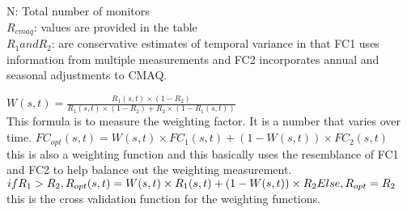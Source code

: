 \documentclass[12pt,a4paper]{article}
\begin{document}
\begin{tasks}
N: Total number of monitors\\
$R_{cmaq}$: values are provided in the table \\
$R_{1} and R_{2}$: are conservative estimates of temporal variance in that FC1 uses information from multiple measurements and FC2 incorporates annual and seasonal adjustments to CMAQ.

\task  $W(s,t) = \frac{R_{1}(s,t) \times (1-R_{2})}{R_{1}(s,t) \times (1-R_{2}) + R_{2} \times (1 - R_{1}(s,t))}$\\
This formula is to measure the weighting factor. It is a number that varies over time. 
\task  $FC_{opt}(s,t) = W(s,t) \times FC_{1}(s,t) + (1 - W(s,t)) \times FC_{2}(s,t)$\\
this is also a weighting function and this basically uses the resemblance of FC1 and FC2 to help balance out the weighting measurement. 
\task  $if R_{1} > R_{2}, R_{opt}(s, t) = W(s,t) \times R_{1}(s,t) + (1 - W(s,t)) \times R_{2} \\ Else, R_{opt} = R_{2}$
this is the cross validation function for the weighting functions. 
\end{tasks}
\end{document}
